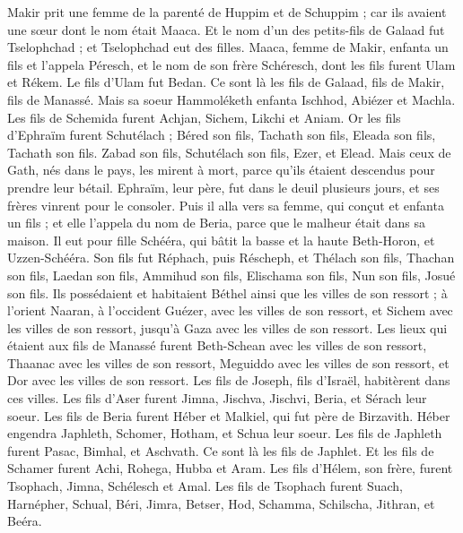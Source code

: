 \begin{multicols}{2}
Makir prit une femme de la parenté de Huppim et de Schuppim ; car ils avaient une sœur dont le nom était Maaca. Et le nom d'un des petits-fils de Galaad fut Tselophchad ; et Tselophchad eut des filles.
Maaca, femme de Makir, enfanta un fils et l'appela Péresch, et le nom de son frère Schéresch, dont les fils furent Ulam et Rékem.
Le fils d'Ulam fut Bedan. Ce sont là les fils de Galaad, fils de Makir, fils de Manassé.
Mais sa soeur Hammoléketh enfanta Ischhod, Abiézer et Machla.
Les fils de Schemida furent Achjan, Sichem, Likchi et Aniam.
Or les fils d'Ephraïm furent  Schutélach ; Béred son fils, Tachath son fils, Eleada son fils, Tachath son fils.
Zabad son fils, Schutélach son fils, Ezer, et Elead. Mais ceux de Gath, nés dans le pays, les mirent à mort, parce qu'ils étaient descendus pour prendre leur bétail.
Ephraïm, leur père, fut dans le deuil plusieurs jours, et ses frères vinrent pour le consoler.
Puis il alla vers sa femme, qui conçut et enfanta un fils ; et elle l'appela du nom de Beria, parce que le malheur était dans sa maison.
Il eut pour fille Schééra, qui bâtit la basse et la haute Beth-Horon, et Uzzen-Schééra.
Son fils fut  Réphach, puis Réscheph, et Thélach son fils, Thachan son fils,
Laedan son fils, Ammihud son fils, Elischama son fils,
Nun son fils, Josué son fils.
Ils possédaient et habitaient Béthel ainsi que les villes de son ressort ; à l’orient Naaran, à l’occident Guézer, avec les villes de son ressort, et Sichem avec les villes de son ressort, jusqu'à Gaza avec les villes de son ressort.
Les lieux qui étaient aux fils de Manassé furent  Beth-Schean avec les villes de son ressort, Thaanac avec les villes de son ressort, Meguiddo avec les villes de son ressort, et Dor avec les villes de son ressort. Les fils de Joseph, fils d'Israël, habitèrent dans ces villes.
Les fils d’Aser furent Jimna, Jischva, Jischvi, Beria, et Sérach leur soeur.
Les fils de Beria furent Héber et Malkiel, qui fut père de Birzavith.
Héber engendra Japhleth, Schomer, Hotham, et Schua leur soeur.
Les fils de Japhleth furent Pasac, Bimhal, et Aschvath. Ce sont là les fils de Japhlet.
Et les fils de Schamer furent Achi, Rohega, Hubba et Aram.
Les fils d'Hélem, son frère, furent  Tsophach, Jimna, Schélesch et Amal.
Les fils de Tsophach furent Suach, Harnépher, Schual, Béri, Jimra,
Betser, Hod, Schamma, Schilscha, Jithran, et Beéra.

\end{multicols}
